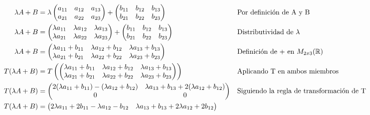 \documentclass[letterpaper]{article}
\renewcommand{\*}{\cdot}
\theoremstyle{definition}
\begin{document}
	\begin{align*}
		\lambda A + B &= \lambda \begin{pmatrix}
		a_{11} & a_{12} & a_{13}\\
		a_{21} & a_{22} & a_{23}
		\end{pmatrix} + \begin{pmatrix}
		b_{11} & b_{12} & b_{13}\\
		b_{21} & b_{22} & b_{23}
		\end{pmatrix} && \text{Por definición de A y B} \\
		\lambda A + B &= \begin{pmatrix}
		\lambda a_{11} & \lambda a_{12} & \lambda a_{13}\\
		\lambda a_{21} & \lambda a_{22} & \lambda a_{23}
		\end{pmatrix} + \begin{pmatrix}
		b_{11} & b_{12} & b_{13}\\
		b_{21} & b_{22} & b_{23}
		\end{pmatrix} && \text{Distributividad de $ \lambda $} \\
		\lambda A + B &= \begin{pmatrix}
		\lambda a_{11} + b_{11} & \lambda a_{12} + b_{12} & \lambda a_{13} +  b_{13}\\
		\lambda a_{21}  + b_{21}& \lambda a_{22} + b_{22} & \lambda a_{23} + b_{23}
		\end{pmatrix} && \text{Definición de + en $  M_{2x3}(\mathbb{R}) $} \\
		T(\lambda A + B) &= T\left( \begin{pmatrix}
		\lambda a_{11} + b_{11} & \lambda a_{12} + b_{12} & \lambda a_{13} +  b_{13}\\
		\lambda a_{21}  + b_{21}& \lambda a_{22} + b_{22} & \lambda a_{23} + b_{23}
		\end{pmatrix}\right) && \text{Aplicando T en ambos miembros} \\
		T(\lambda A + B) &= \begin{pmatrix}
		2(\lambda a_{11} + b_{11}) -(\lambda a_{12} + b_{12})  &\lambda a_{13} +  b_{13} + 2(\lambda a_{12} + b_{12})\\
		0& 0
		\end{pmatrix} && \text{Siguiendo la regla de transformación de T} \\
		T(\lambda A + B) &= \begin{pmatrix}
		2\lambda a_{11} + 2b_{11} -\lambda a_{12} - b_{12}  &\lambda a_{13} +  b_{13} + 2\lambda a_{12} + 2b_{12}\\

\end{pmatrix}
\end{align*}
\end{document}
